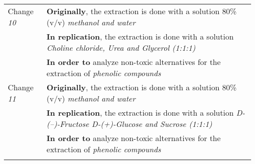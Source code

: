 \begin{table*}[h]
\begin{tabularx}{\textwidth}{
  >{\hsize=0.25\hsize}X
  >{\hsize=0.8\hsize}X}
    Change \textit{10}   & \textbf{Originally}, the extraction is done with a solution 80\% (v/v) \emph{methanol and water}  \\& \textbf{In replication}, the extraction is done with a solution \emph{Choline chloride, Urea and Glycerol (1:1:1)}  \\& \textbf{In order to} analyze non-toxic alternatives for the extraction of \emph{phenolic compounds}   \\ 
    \noalign{\smallskip\smallskip}\hline 
    
    Change \textit{11}   & \textbf{Originally}, the extraction is done with a solution 80\% (v/v) \emph{methanol and water}  \\& \textbf{In replication}, the extraction is done with a solution \emph{D-(--)-Fructose D-(+)-Glucose and Sucrose (1:1:1)}  \\& \textbf{In order to} analyze non-toxic alternatives for the extraction of \emph{phenolic compounds}   \\ 
    \noalign{\smallskip\smallskip}\hline 



	\end{tabularx}  
\end{table*}
